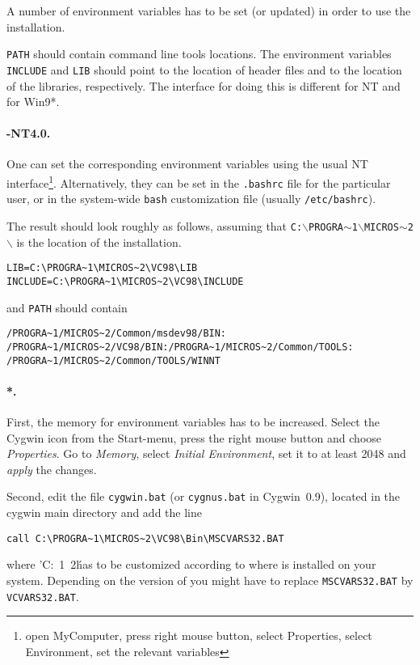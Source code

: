 A number of environment variables has to be set (or updated)
in order to use the installation.

\texttt{PATH} should contain \msvc{} command line tools locations.
The environment variables \texttt{INCLUDE} and \texttt{LIB} should
point to the location of \msvc{} header files and to the location of
the \msvc{} libraries, respectively.  The interface for doing this is
different for NT and for Win9*.

\paragraph{\mswin-NT4.0.}

One can set the corresponding environment variables using the
usual NT interface\footnote{open MyComputer, press right mouse button,
  select Properties, select Environment, set the relevant variables}.
Alternatively, they can be set in the \texttt{.bashrc} file for the
particular user, or in the system-wide \texttt{bash} customization
file (usually \texttt{/etc/bashrc}).

The result should look roughly as follows, assuming that
\texttt{C:$\backslash$PROGRA$\sim$1$\backslash$MICROS$\sim$2$\backslash$}
is the location of the \msvc{} installation.
\begin{verbatim}
LIB=C:\PROGRA~1\MICROS~2\VC98\LIB
INCLUDE=C:\PROGRA~1\MICROS~2\VC98\INCLUDE
\end{verbatim}
and \texttt{PATH} should contain
\begin{verbatim}
/PROGRA~1/MICROS~2/Common/msdev98/BIN:
/PROGRA~1/MICROS~2/VC98/BIN:/PROGRA~1/MICROS~2/Common/TOOLS:
/PROGRA~1/MICROS~2/Common/TOOLS/WINNT
\end{verbatim}

\paragraph{*.} 

First, the memory for environment variables has to be increased.
Select the Cygwin icon from the Start-menu, press the right mouse
button and choose \textit{Properties}. Go to \textit{Memory}, select
\textit{Initial Environment}, set it to at least 2048 and
\textit{apply} the changes.

Second, edit the file \texttt{cygwin.bat} (or \texttt{cygnus.bat} in
Cygwin~0.9), located in the cygwin main directory and add the line
\begin{verbatim}
call C:\PROGRA~1\MICROS~2\VC98\Bin\MSCVARS32.BAT
\end{verbatim}
where
\nonlinkedpath'C:\PROGRA~1\MICROS~2\'
has to be customized according to where \msvc{} is installed on your
system. Depending on the version of \msvc{} you might have to replace
\texttt{MSCVARS32.BAT} by \texttt{VCVARS32.BAT}.

